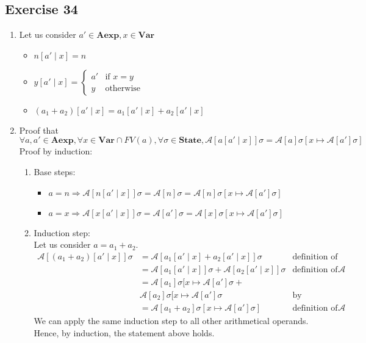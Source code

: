 \documentclass[12pt,fleqn]{article}		%
\begin{document}
\subsection{Exercise 34}
\begin{enumerate}
\item Let us consider $ a' \in \textbf{Aexp}, x \in \textbf{Var} $
\begin{itemize}
\item $ n[a' \mid x] = n $
\item $ y[a' \mid x] = \begin{cases} a' & \text{if } x=y\\ y & \text{otherwise} \end{cases} $
\item $ (a_1 + a_2)[a' \mid x] = a_1[a' \mid x] + a_2[a' \mid x] $
\end{itemize}
\item Proof that $ \forall a, a' \in \textbf{Aexp}, \forall x \in \textbf{Var} \cap FV(a), \forall \sigma \in \textbf{State}, \mathcal{A}[a[a' \mid x]]\sigma = \mathcal{A}[a]\sigma[x \mapsto \mathcal{A}[a']\sigma] $\\
Proof by induction:\\
\begin{enumerate}
\item Base steps:
\begin{itemize}
\item $ a = n \Rightarrow \mathcal{A}[n[a' \mid x]]\sigma = \mathcal{A}[n]\sigma = \mathcal{A}[n]\sigma[x \mapsto \mathcal{A}[a']\sigma] $
\item $ a = x \Rightarrow \mathcal{A}[x[a' \mid x]]\sigma = \mathcal{A}[a']\sigma = \mathcal{A}[x]\sigma[x \mapsto \mathcal{A}[a']\sigma] $
\end{itemize}
\item Induction step:\\
Let us consider $ a = a_1 + a_2 $.\\
\begin{align*}
\mathcal{A}[(a_1 + a_2)[a' \mid x]]\sigma & = \mathcal{A}[a_1[a' \mid x] + a_2[a' \mid x]]\sigma & \text{definition of substitution}\\
& = \mathcal{A}[a_1[a' \mid x]]\sigma + \mathcal{A}[a_2[a'\mid x]]\sigma & \text{definition of } \mathcal{A}\\
& = \mathcal{A}[a_1]\sigma[x \mapsto \mathcal{A}[a']\sigma +\\ & \mathcal{A}[a_2]\sigma[x \mapsto \mathcal{A}[a']\sigma & \text{by induction}\\
& = \mathcal{A}[a_1+a_2]\sigma[x \mapsto \mathcal{A}[a']\sigma] & \text{definition of } \mathcal{A}
\end{align*}
We can apply the same induction step to all other arithmetical operands.\\
Hence, by induction, the statement above holds.
\end{enumerate}
\end{enumerate}
\end{document}
